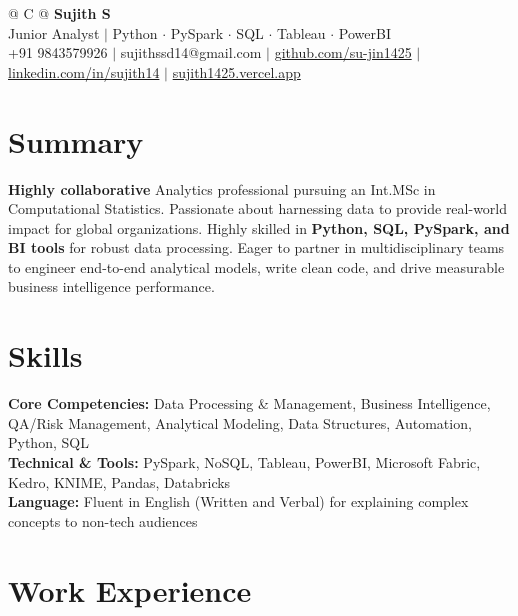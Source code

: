 \documentclass[a4paper,11pt]{article}
\newcommand{\ulink}[2]{\href{#1}{#2}}
\begin{document}
\pagestyle{empty}

\begin{tabularx}{\linewidth}{@{} C @{}}
{\color[HTML]{000000}\fontsize{30}{35}\selectfont\bfseries Sujith S} \\[5pt]
{\fontsize{10.5}{12.5}\selectfont\color[HTML]{3A3A3A}
Junior Analyst $|$ Python $\cdot$ PySpark $\cdot$ SQL $\cdot$ Tableau $\cdot$ PowerBI} \\[6pt]
{\fontsize{9.5}{11.5}\selectfont\textcolor[HTML]{3A3A3A}{+91 9843579926 $|$ sujithssd14@gmail.com $|$ \ulink{https://github.com/su-jin1425}{github.com/su-jin1425} $|$ \ulink{https://linkedin.com/in/sujith14}{linkedin.com/in/sujith14} $|$ \ulink{https://sujith1425.vercel.app}{sujith1425.vercel.app}}}
\end{tabularx}

\section{Summary}
\vspace{2pt}

{\color[HTML]{0A0A0A}\fontsize{11}{14}\selectfont
\textbf{Highly collaborative} Analytics professional pursuing an Int.MSc in Computational Statistics. Passionate about harnessing data to provide real-world impact for global organizations. Highly skilled in \textbf{Python, SQL, PySpark, and BI tools} for robust data processing. Eager to partner in multidisciplinary teams to engineer end-to-end analytical models, write clean code, and drive measurable business intelligence performance.}

\section{Skills}
\vspace{2pt}

{\color[HTML]{0A0A0A}\fontsize{11}{14}\selectfont
\textbf{Core Competencies:} Data Processing \& Management, Business Intelligence, QA/Risk Management, Analytical Modeling, Data Structures, Automation, Python, SQL \\[2pt]
\textbf{Technical \& Tools:} PySpark, NoSQL, Tableau, PowerBI, Microsoft Fabric, Kedro, KNIME, Pandas, Databricks \\[2pt]
\textbf{Language:} Fluent in English (Written and Verbal) for explaining complex concepts to non-tech audiences}

\section{Work Experience}
\vspace{2pt}
\end{document}
